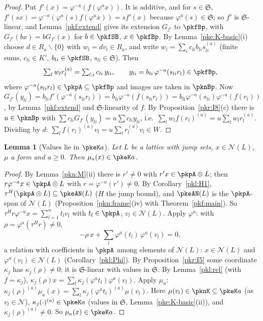 \documentclass[10pt]{amsart}
\newtheorem{lemma}[theorem]{Lemma}
\theoremstyle{definition}
\theoremstyle{remark}
\begin{document}
\begin{proof}
Put $f'(x)=\varphi^{-a}(f(\varphi^ax))$. It is additive, and for $s\in\mathfrak S$, $f'(sx)=
\varphi^{-a}(\varphi^a(s)f(\varphi^ax))=sf'(x)$ because $\varphi^a(s)\in\mathfrak S$; so $f'$ is $\mathfrak
S$-linear, and Lemma~\ref{pkf:extend} gives its extension $G_{f'}$ to $\pkfBp$, with $G_{f'}(bx)=bG_{f'}(x)$
for $b\in\pkfSB$, $x\in\pkfBp$. By Lemma~\ref{pke:K-basic}(i) choose $d\in R_a\smallsetminus\{0\}$ with
$w_l=dv_l\in R_a$, and write $w_l=\sum_ic_{li}b_{li}s_{li}^{(a)}$ (finite sums, $c_{li}\in K'$,
$b_{li}\in\pkfSB$, $s_{li}\in\mathfrak S$). Then
\[
\textstyle\sum_lw_lr_l^{(a)}=\sum_{l,i}c_{li}\,y_{li},\qquad y_{li}=b_{li}\,\varphi^{-a}(s_{li}r_l)\in\pkfBp,
\]
where $\varphi^{-a}(s_{li}r_l)\in\pkpA\subseteq\pkfBp$ and images are taken in $\pknBp$. Now
$G_{f'}(y_{li})=b_{li}f'(\varphi^{-a}(s_{li}r_l))=b_{li}\varphi^{-a}(f(s_{li}r_l))=b_{li}\varphi^{-a}(s_{li})
\varphi^{-a}(f(r_l))$, by Lemma~\ref{pkf:extend} and $\mathfrak S$-linearity of $f$. By
Proposition~\ref{pkr:I8}(c) there is $u\in\pknBp$ with $\sum c_{li}G_{f'}(y_{li})=u\sum c_{li}y_{li}$, i.e.\
$\sum_lw_lf(r_l)^{(a)}=u\sum_lw_lr_l^{(a)}$. Dividing by $d$: $\sum_lf(r_l)^{(a)}v_l=u\sum_lr_l^{(a)}v_l\in
W$.
\end{proof}

\begin{lemma}[Values lie in $\pkeK a$]\label{pke:values}
Let $L$ be a lattice with jump sets, $x\in\mathcal N(L)$, $\mu$ a form and $a\ge0$. Then $\mu_a(x)\in\pkeK
a$.
\end{lemma}

\begin{proof}
By Lemma~\ref{pkn:M}(ii) there is $r'\ne0$ with $r'x\in\pkpA\otimes L$; then $r\varphi^{-a}x\in\pkpA\otimes L$
with $r=\varphi^{-a}(r')\ne0$. By Corollary~\ref{pkl:H1}, $\tau^H(\pkpA\otimes L)\subseteq\pkeAN(L)$ ($H$ the
jump bound), and $\pkeAN(L)$ is the $\pkpA$-span of $\mathcal N(L)$ (Proposition~\ref{pkn:frame}(iv) with
Theorem~\ref{pkf:main}). So $\tau^Hr\varphi^{-a}x=\sum_{l=1}^n t_lv_l$ with $t_l\in\pkpA$, $v_l\in\mathcal N(L)$.
Apply $\varphi^a$: with $\rho=\varphi^a(\tau^Hr)\ne0$,
\[
\textstyle-\rho\,x+\sum_l\varphi^a(t_l)\,\varphi^a(v_l)=0,
\]
a relation with coefficients in $\pkpA$ among elements of $\mathcal N(L)$: $x\in\mathcal N(L)$ and
$\varphi^a(v_l)\in\mathcal N(L)$ (Corollary~\ref{pkl:Phi}). By Proposition~\ref{pkr:I5} some coordinate
$\kappa_j$ has $\kappa_j(\rho)\ne0$; it is $\mathfrak S$-linear with values in $\mathfrak S$. By
Lemma~\ref{pkl:rel} (with $f=\kappa_j$), $\kappa_j(\rho)x=\sum_l\kappa_j(\varphi^at_l)\varphi^a(v_l)$. Apply
$\mu_a$: $\kappa_j(\rho)^{(a)}\mu_a(x)=\sum_l\kappa_j(\varphi^at_l)^{(a)}\mu(v_l)$. Here $\mu(v_l)\in\pknK
\subseteq\pkeK a$ (as $v_l\in\mathcal N$), $\kappa_j(\cdot)^{(a)}\in\pkeK a$ (values in $\mathfrak S$,
Lemma~\ref{pke:K-basic}(ii)), and $\kappa_j(\rho)^{(a)}\ne0$. So $\mu_a(x)\in\pkeK a$.
\end{proof}
\end{document}
